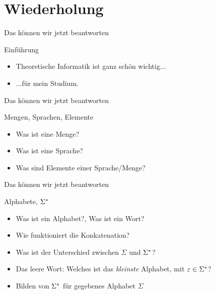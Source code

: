 \section{Wiederholung} 
\begin{frame}[fragile]{Das können wir jetzt beantworten}
    \begin{alertblock}{Einführung}
    \begin{itemize}
        \item Theoretische Informatik ist ganz schön wichtig...
        \item ...für mein Studium.
    \end{itemize}
    \end{alertblock}
\end{frame}

\begin{frame}[fragile]{Das können wir jetzt beantworten}
    \begin{alertblock}{Mengen, Sprachen, Elemente}
    \begin{itemize}
        \item Was ist eine Menge?
        \item Was ist eine Sprache?
        \item Was sind Elemente einer Sprache/Menge?
    \end{itemize}
    \end{alertblock}
\end{frame}

\begin{frame}[fragile]{Das können wir jetzt beantworten}
    \begin{alertblock}{Alphabete, $\Sigma^{*}$}
    \begin{itemize}
        \item Was ist ein Alphabet?, Was ist ein Wort?
        \item Wie funktioniert die Konkatenation?
        \item Was ist der Unterschied zwischen $\Sigma$ und $\Sigma^{*}$?
        \item Das leere Wort: Welches ist das \textit{kleinste} Alphabet, mit $\varepsilon \in \Sigma^{*}$?
        \item Bilden von $\Sigma^{*}$ für gegebenes Alphabet $\Sigma$
    \end{itemize}
    \end{alertblock}
\end{frame}

